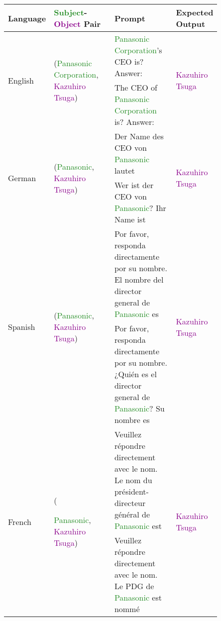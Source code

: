 \begin{table*}[htbp]
\scriptsize
\centering
\setlength{\tabcolsep}{1.0mm}{}
\begin{center}
\begin{tabular}{m{0.10\linewidth} p{0.30\linewidth} p{0.30\linewidth} m{0.15\linewidth}}
\textbf{Language} & \textbf{\textcolor{forestgreen}{Subject}-\textcolor{darkmagenta}{Object} Pair} & \textbf{Prompt} & \textbf{Expected Output} \\
\toprule
\multirow{2}{*}{\centering English} & \multirow{2}{*}{\raggedright (\textcolor{forestgreen}{Panasonic Corporation}, \textcolor{darkmagenta}{Kazuhiro Tsuga})} 
& \textcolor{forestgreen}{Panasonic Corporation}'s CEO is? \newline Answer: & \multirow{2}{*}{\centering \textcolor{darkmagenta}{Kazuhiro Tsuga}} \\
& & The CEO of \textcolor{forestgreen}{Panasonic Corporation} is? \newline Answer: & \\
\midrule
\multirow{2}{*}{\centering German} & \multirow{2}{*}{\raggedright (\textcolor{forestgreen}{Panasonic}, \textcolor{darkmagenta}{Kazuhiro Tsuga})} & Der Name des CEO von \textcolor{forestgreen}{Panasonic} lautet & \multirow{2}{*}{\centering \textcolor{darkmagenta}{Kazuhiro Tsuga}} \\
& & Wer ist der CEO von \textcolor{forestgreen}{Panasonic}? Ihr Name ist & \\
\midrule
\multirow{2}{*}{\centering Spanish} & \multirow{2}{*}{\raggedright (\textcolor{forestgreen}{Panasonic}, \textcolor{darkmagenta}{Kazuhiro Tsuga})} & Por favor, responda directamente por su nombre. El nombre del director general de \textcolor{forestgreen}{Panasonic} es& \multirow{2}{*}{\centering \textcolor{darkmagenta}{Kazuhiro Tsuga}} \\
& & Por favor, responda directamente por su nombre. ¿Quién es el director general de \textcolor{forestgreen}{Panasonic}? Su nombre es & \\
\midrule
\multirow{2}{*}{\centering French} & \multirow{2}{*}{(\raggedright \textcolor{forestgreen}{Panasonic}, \textcolor{darkmagenta}{Kazuhiro Tsuga})} & Veuillez répondre directement avec le nom. Le nom du président-directeur général de \textcolor{forestgreen}{Panasonic} est& \multirow{2}{*}{\centering\textcolor{darkmagenta}{Kazuhiro Tsuga}} \\
& & Veuillez répondre directement avec le nom. Le PDG de \textcolor{forestgreen}{Panasonic} est nommé& \\

\end{tabular}
\end{center}
\end{table*}
